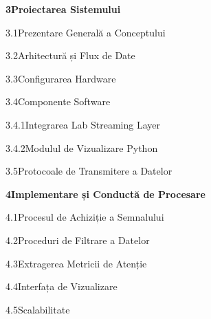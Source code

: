 {\large\noindent\textbf{3\quad Proiectarea Sistemului}\dotfill\textbf{\pageref{cap:sysdes}}\par}
\vspace{2pt}
\noindent\hspace{1.5em}3.1\enspace Prezentare Generală a Conceptului\dotfill\pageref{sect:concov}\par
\noindent\hspace{1.5em}3.2\enspace Arhitectură și Flux de Date\dotfill\pageref{sect:archndf}\par
\noindent\hspace{1.5em}3.3\enspace Configurarea Hardware\dotfill\pageref{sect:hwset}\par
\noindent\hspace{1.5em}3.4\enspace Componente Software\dotfill\pageref{sect:swcomp}\par
\noindent\hspace{3.0em}3.4.1\enspace Integrarea Lab Streaming Layer\dotfill\pageref{ssect:lsl}\par
\noindent\hspace{3.0em}3.4.2\enspace Modulul de Vizualizare Python\dotfill\pageref{ssect:pyvizmod}\par
\noindent\hspace{1.5em}3.5\enspace Protocoale de Transmitere a Datelor\dotfill\pageref{sect:commnsync}\par
\bigskip

{\large\noindent\textbf{4\quad Implementare și Conductă de Procesare}\dotfill\textbf{\pageref{cap:implnprocpipe}}\par}
\vspace{2pt}
\noindent\hspace{1.5em}4.1\enspace Procesul de Achiziție a Semnalului\dotfill\pageref{sect:signacqproc}\par
\noindent\hspace{1.5em}4.2\enspace Proceduri de Filtrare a Datelor\dotfill\pageref{sect:datafiltproc}\par
\noindent\hspace{1.5em}4.3\enspace Extragerea Metricii de Atenție\dotfill\pageref{sect:attmetrextr}\par
\noindent\hspace{1.5em}4.4\enspace Interfața de Vizualizare\dotfill\pageref{sect:visint}\par
\noindent\hspace{1.5em}4.5\enspace Scalabilitate\dotfill\pageref{sect:scal}\par
\bigskip

